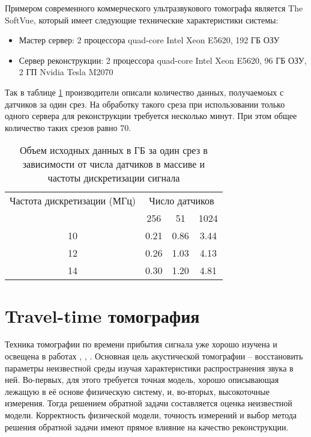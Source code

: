 \documentclass{spisok-article}
\begin{document}
Примером современного коммерческого ультразвукового томографа является The SoftVue\cite{roy2013breast}, который имеет следующие технические характеристики системы:
\begin{itemize}
\item Мастер сервер: 2 процессора quad-core Intel Xeon E5620, 192 ГБ ОЗУ
\item Сервер реконструкции: 2 процессора quad-core Intel Xeon E5620, 96 ГБ ОЗУ, 2 ГП Nvidia Tesla M2070
\end{itemize}
Так в таблице \ref{table:datasize_ex} производители описали количество данных, получаемоых с датчиков за один срез. На обработку такого среза при использовании только одного сервера для реконструкции требуется несколько минут\cite{roy2013breast}. При этом общее количество таких срезов равно 70. 

\begin{table}[h]
\caption{Объем исходных данных в ГБ за один срез в зависимости от числа датчиков в массиве и частоты дискретизации сигнала \cite{roy2013breast}}
\begin{center}\begin{tabular}{ c | c | c | c }
    \hline
    {Частота дискретизации (МГц)} & \multicolumn{3}{c}{Число датчиков}  \\ \cline{2-4}
    & 256 & 51 & 1024 \\
    
    \hline
    10 & 0.21 & 0.86 & 3.44 \\
    12 & 0.26 & 1.03 & 4.13 \\
    14 & 0.30 & 1.20 & 4.81 \\
    \hline
\end{tabular}\end{center}

\label{table:datasize_ex}
\end{table}

\section{Travel-time томография}
Техника томографии по времени прибытия сигнала уже хорошо изучена и освещена в работах \cite{Kunyansky2012111}, \cite{quan2007sound}, \cite{hopp2014breast}. Основная цель акустической томографии -- восстановить параметры неизвестной среды изучая характеристики распространения звука в ней. Во-первых, для этого требуется точная модель, хорошо описывающая лежащую в её основе физическую систему, и, во-вторых, высокоточные измерения. Тогда решением обратной задачи составляется оценка неизвестной модели. Корректность физической модели, точность измерений и выбор метода решения обратной задачи имеют прямое влияние на качество реконструкции. \\
\end{document}
